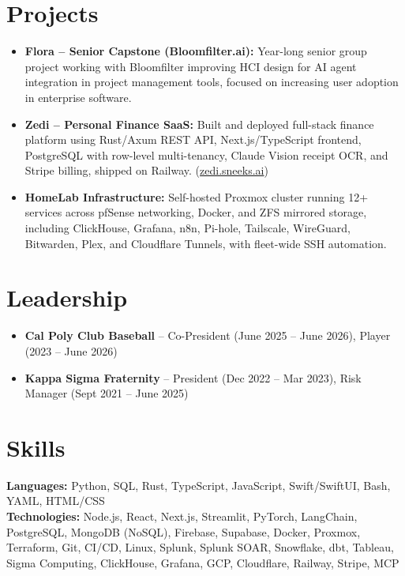 \documentclass[letterpaper,11pt]{article}
\begin{document}
\section{Projects}
\begin{itemize}[leftmargin=0.15in, label=\textbullet, itemsep=0pt, parsep=0pt]
  \item \small{\textbf{Flora -- Senior Capstone (Bloomfilter.ai):} Year-long senior group project working with Bloomfilter improving HCI design for AI agent integration in project management tools, focused on increasing user adoption in enterprise software.}
  \item \small{\textbf{Zedi -- Personal Finance SaaS:} Built and deployed full-stack finance platform using Rust/Axum REST API, Next.js/TypeScript frontend, PostgreSQL with row-level multi-tenancy, Claude Vision receipt OCR, and Stripe billing, shipped on Railway. (\href{https://zedi.sneeks.ai}{zedi.sneeks.ai})}
  \item \small{\textbf{HomeLab Infrastructure:} Self-hosted Proxmox cluster running 12+ services across pfSense networking, Docker, and ZFS mirrored storage, including ClickHouse, Grafana, n8n, Pi-hole, Tailscale, WireGuard, Bitwarden, Plex, and Cloudflare Tunnels, with fleet-wide SSH automation.}
\end{itemize}

\section{Leadership}
\begin{itemize}[leftmargin=0.15in, label=\textbullet, itemsep=0pt, parsep=0pt]
  \item \small{\textbf{Cal Poly Club Baseball} -- Co-President (June 2025 -- June 2026), Player (2023 -- June 2026)}
  \item \small{\textbf{Kappa Sigma Fraternity} -- President (Dec 2022 -- Mar 2023), Risk Manager (Sept 2021 -- June 2025)}
\end{itemize}

\section{Skills}
{\small
\textbf{Languages:} Python, SQL, Rust, TypeScript, JavaScript, Swift/SwiftUI, Bash, YAML, HTML/CSS \\
\textbf{Technologies:} Node.js, React, Next.js, Streamlit, PyTorch, LangChain, PostgreSQL, MongoDB (NoSQL), Firebase, Supabase, Docker, Proxmox, Terraform, Git, CI/CD, Linux, Splunk, Splunk SOAR, Snowflake, dbt, Tableau, Sigma Computing, ClickHouse, Grafana, GCP, Cloudflare, Railway, Stripe, MCP
}

\end{document}
